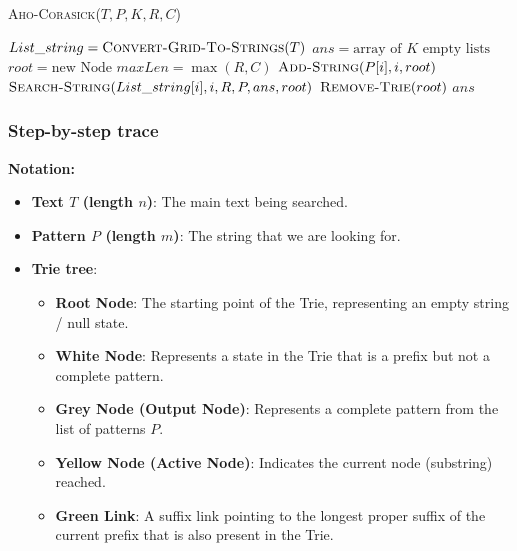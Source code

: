         \textsc{Aho-Corasick}($T, P, K, R, C$)
        \begin{algorithmic}[1]
        \State $List\_string = \textsc{Convert-Grid-To-Strings}(T)$
        \State $ans = \text{array of } K \text{ empty lists}$
        \State $root = \text{new Node}$
        \State $maxLen = \max(R, C)$
        \Statex
                \State $\textsc{Add-String}(P[i], i, root)$
            \EndIf
        \EndFor
        \Statex
            \State $\textsc{Search-String}(List\_string[i], i, R, P, ans, root)$
        \EndFor
        \Statex
        \State $\textsc{Remove-Trie}(root)$ 
        \State \Return $ans$
        \end{algorithmic}

    \subsubsection{Step-by-step trace}
    \indent \textbf{Notation:}
        \begin{itemize}
            \item \textbf{Text $T$ (length $n$)}: The main text being searched.
            \item \textbf{Pattern $P$ (length $m$)}: The string that we are looking for.
            \item \textbf{Trie tree}:
            \begin{itemize}
                \item \textbf{Root Node}: The starting point of the Trie, representing an empty string / null state.
                \item \textbf{White Node}: Represents a state in the Trie that is a prefix but not a complete pattern.
                \item \textbf{Grey Node (Output Node)}: Represents a complete pattern from the list of patterns $P$.
                \item \textbf{Yellow Node (Active Node)}: Indicates the current node (substring) reached.                
                \item \textbf{Green Link}: A suffix link pointing to the longest proper suffix of the current prefix that is also present in the Trie.
            \end{itemize}
        \end{itemize}

